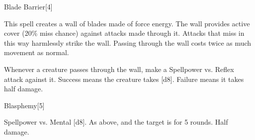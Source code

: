 \begin{spellsection}{Blade Barrier}[4]
    \begin{spellheader}
    \end{spellheader}
    \begin{spellcontent}
        \begin{spelltargetinginfo}
        \end{spelltargetinginfo}
        \begin{spelleffects}
            \spelleffect This spell creates a wall of blades made of force energy. The wall provides active cover (20\% miss chance) against attacks made through it. Attacks that miss in this way harmlessly strike the wall. Passing through the wall costs twice as much movement as normal.

            Whenever a creature passes through the wall, make a Spellpower vs. Reflex attack against it. Success means the creature takes [d8]. Failure means it takes half damage.
            \spelldur \durshort \dismissable
        \end{spelleffects}
    \end{spellcontent}
    \begin{spellfooter}
        \miscastexplode
    \end{spellfooter}
\end{spellsection}

\begin{spellsection}{Blasphemy}[5]
    \begin{spellheader}
    \end{spellheader}
    \begin{spellcontent}
        \begin{spelltargetinginfo}
        \end{spelltargetinginfo}
        \begin{spelleffects}
            \begin{spellattack}{Spellpower vs. Mental}
                \spellsuccess {}[d8].
                \spellcritical As above, and the target is \staggered for 5 rounds.
                \spellfailure Half damage.
            \end{spellattack}
        \end{spelleffects}
    \end{spellcontent}
    \begin{spellfooter}
        \miscastexplode
    \end{spellfooter}
\end{spellsection}

